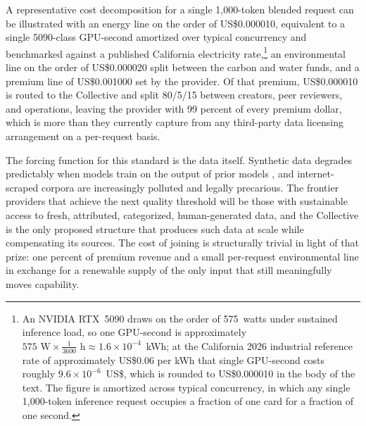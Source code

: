 \documentclass[10pt,a4paper,twocolumn]{article}
\begin{document}
A representative cost decomposition for a single 1{,}000-token blended request can be illustrated with an energy line on the order of US\$0.000010, equivalent to a single 5090-class GPU-second amortized over typical concurrency and benchmarked against a published California electricity rate,\footnote{An NVIDIA RTX~5090 draws on the order of 575~watts under sustained inference load, so one GPU-second is approximately $575 \text{ W} \times \tfrac{1}{3600}\text{ h} \approx 1.6 \times 10^{-4}$~kWh; at the California 2026 industrial reference rate of approximately US\$0.06 per kWh that single GPU-second costs roughly $9.6 \times 10^{-6}$~US\$, which is rounded to US\$0.000010 in the body of the text. The figure is amortized across typical concurrency, in which any single 1{,}000-token inference request occupies a fraction of one card for a fraction of one second.} an environmental line on the order of US\$0.000020 split between the carbon and water funds, and a premium line of US\$0.001000 set by the provider. Of that premium, US\$0.000010 is routed to the Collective and split 80/5/15 between creators, peer reviewers, and operations, leaving the provider with 99 percent of every premium dollar, which is more than they currently capture from any third-party data licensing arrangement on a per-request basis.

The forcing function for this standard is the data itself. Synthetic data degrades predictably when models train on the output of prior models \citep{shumailov2024modelcollapse}, and internet-scraped corpora are increasingly polluted and legally precarious. The frontier providers that achieve the next quality threshold will be those with sustainable access to fresh, attributed, categorized, human-generated data, and the Collective is the only proposed structure that produces such data at scale while compensating its sources. The cost of joining is structurally trivial in light of that prize: one percent of premium revenue and a small per-request environmental line in exchange for a renewable supply of the only input that still meaningfully moves capability.
\end{document}

